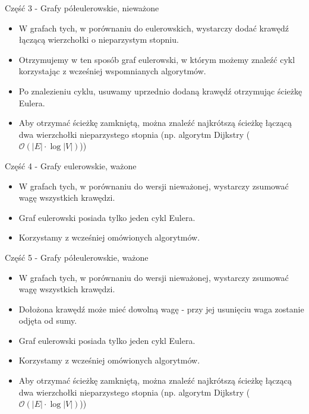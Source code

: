 \documentclass[polish,envcountsect,10pt]{beamer}
\begin{document}
\begin{frame}{Część 3 - Grafy półeulerowskie, nieważone}
    \begin{block}{}
        \begin{itemize}
            \item W grafach tych, w porównaniu do eulerowskich, wystarczy dodać krawędź łączącą wierzchołki o nieparzystym stopniu.
            \item Otrzymujemy w ten sposób graf eulerowski, w którym możemy znaleźć cykl korzystając z wcześniej wspomnianych algorytmów.
            \item Po znalezieniu cyklu, usuwamy uprzednio dodaną krawędź otrzymując ścieżkę Eulera.
            \item Aby otrzymać ścieżkę zamkniętą, można znaleźć najkrótszą ścieżkę łączącą dwa wierzchołki nieparzystego stopnia (np. algorytm Dijkstry ($\mathcal{O}({|E|} \cdot {\log |V|})$))
        \end{itemize}
    \end{block}
\end{frame}

\begin{frame}{Część 4 - Grafy eulerowskie, ważone}
    \begin{block}{}
        \begin{itemize}
            \item W grafach tych, w porównaniu do wersji nieważonej, wystarczy zsumować wagę wszystkich krawędzi.
            \item Graf eulerowski posiada tylko jeden cykl Eulera.
            \item Korzystamy z wcześniej omówionych algorytmów.
        \end{itemize}
    \end{block}
\end{frame}

\begin{frame}{Część 5 - Grafy półeulerowskie, ważone}
    \begin{block}{}
        \begin{itemize}
            \item W grafach tych, w porównaniu do wersji nieważonej, wystarczy zsumować wagę wszystkich krawędzi.
            \item Dołożona krawędź może mieć dowolną wagę - przy jej usunięciu waga zostanie odjęta od sumy.
            \item Graf eulerowski posiada tylko jeden cykl Eulera.
            \item Korzystamy z wcześniej omówionych algorytmów.
            \item Aby otrzymać ścieżkę zamkniętą, można znaleźć najkrótszą ścieżkę łączącą dwa wierzchołki nieparzystego stopnia (np. algorytm Dijkstry ($\mathcal{O}({|E|} \cdot {\log |V|})$))
        \end{itemize}
    \end{block}
\end{frame}
\end{document}
